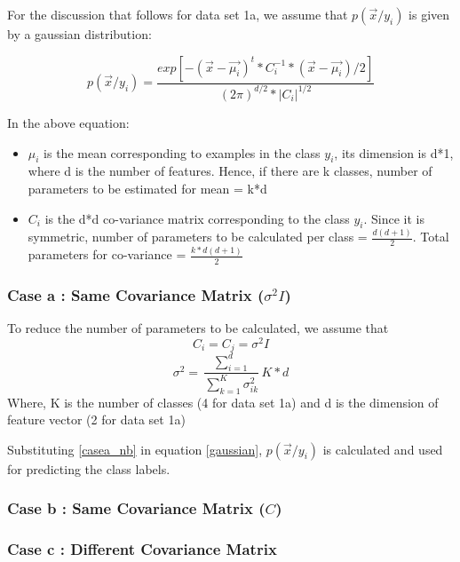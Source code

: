 \documentclass[11pt,a4paper]{article}
\newcommand{\noi}{\noindent}
\begin{document}
\noi
For the discussion that follows for data set 1a, we assume that $p(\vec{x}/y_{i})$ is given by a gaussian distribution:

\begin{equation}
\label{gaussian}
    p(\vec{x}/y_{i})=\frac{exp[-(\vec{x}-\vec{\mu_{i}})^{t}*C_{i}^{-1}*(\vec{x}-\vec{\mu_{i}})/2]}{(2\pi)^{d/2}*|C_{i}|^{1/2}}
\end{equation}

\noi
In the above equation: 

\begin{itemize}
    \item $\mu_{i}$ is the mean corresponding to examples in the class $y_{i}$, its dimension is d*1, where d is the number of features. Hence, if there are k classes, number of parameters to be estimated for mean = k*d
    \item $C_{i}$ is the d*d co-variance matrix corresponding to the class $y_{i}$. Since it is symmetric, number of parameters to be calculated per class = $\frac{d(d+1)}{2}$. Total parameters for co-variance = $\frac{k*d(d+1)}{2}$
\end{itemize}

\subsubsection{ Case a : Same Covariance Matrix ($\sigma^2I$)}

To reduce the number of parameters to be calculated, we assume that
\begin{equation}
    C_{i}=C_{j}=\sigma^{2}I
\end{equation}
\begin{equation}
\label{casea_nb}
    \sigma^{2}=\frac{\sum_{i=1}^{d}}{\sum_{k=1}^{K}\sigma^{2}_{ik}}{K*d}
\end{equation}
Where, K is the number of classes (4 for data set 1a) and d is the dimension of feature vector (2 for data set 1a)

Substituting \ref{casea_nb} in equation \ref{gaussian}, $p(\vec{x}/y_{i})$ is calculated and used for predicting the class labels. 

\subsubsection{ Case b : Same Covariance Matrix ($C$)}
\subsubsection{ Case c : Different Covariance Matrix}
\end{document}
